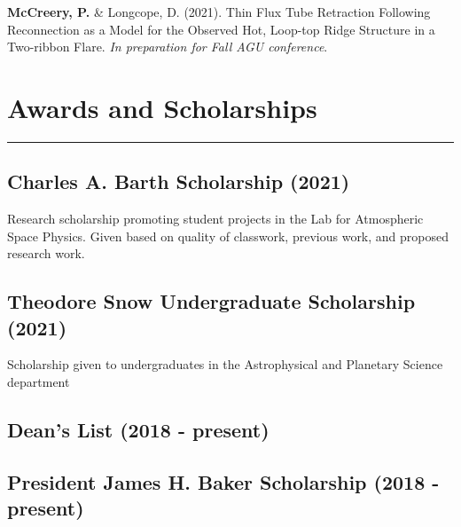 \documentclass{article}
\newcommand{\divider}{\vskip-2pt\hrule\vskip4pt}
\begin{document}
\textbf{McCreery, P.} \& Longcope, D. (2021). Thin Flux Tube Retraction Following Reconnection as a Model for the Observed Hot, Loop-top Ridge Structure in a Two-ribbon Flare. \textit{In preparation for Fall AGU conference}.

\pagebreak

\section{Awards and Scholarships}
\divider
\subsection{Charles A. Barth Scholarship (2021)}

Research scholarship promoting student projects in the Lab for Atmospheric Space Physics. Given based on quality of classwork, previous work, and proposed research work. 

\subsection{Theodore Snow Undergraduate Scholarship (2021)}

Scholarship given to undergraduates in the Astrophysical and Planetary Science department 
\subsection{Dean's List (2018 - present)}
\subsection{President James H. Baker Scholarship (2018 - present)}
\end{document}
